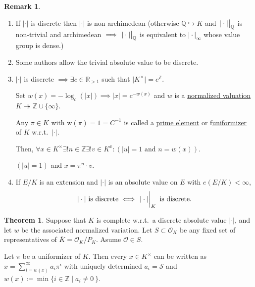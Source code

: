 \documentclass[openany]{amsbook}
\numberwithin{section}{chapter}
\theoremstyle{definition}
\newtheorem*{remark}{Remark}
\newtheorem{theorem}{Theorem}[chapter]
\begin{document}
\begin{remark}
    \begin{enumerate}[label=\arabic*)]
        \item If \(\vert \cdot \vert\) is discrete then \(\vert \cdot \vert \) is non-archimedean (otherwise \(\mathbb{Q} \hookrightarrow K\) and \(\eval{\vert \cdot \vert }_{\mathbb{Q}}\) is non-trivial and archimedean \(\implies \eval{\vert \cdot \vert}_{\mathbb{Q}}\) is equivalent to \(\vert \cdot \vert_\infty\) whose value group is dense.)
        \item Some authors allow the trivial absolute value to be discrete.
        \item \(\vert \cdot \vert\) is discrete \(\implies \exists c \in \mathbb{R}_{>1}\) such that \(\vert K^\times \vert = c^\mathbb{Z}\).
        
        Set \(w(x) = - \log_c(\vert x \vert) \implies \vert x \vert = c^{-w(x)}\) and \(w\) is a \underline{normalized valuation} \(K \twoheadrightarrow \mathbb{Z} \cup \{ \infty \} \).

        Any \(\pi \in K\) with w\((\pi) = 1 = C ^{-1}\) is called a \underline{prime element} or f\underline{uniformizer} of \(K\) w.r.t.\ \(\vert \cdot \vert\).

        Then, \(\forall x\in K^\times \exists ! n\in \mathbb{Z} \exists !v \in K^x : (\vert u \vert = 1 \text{ and } n=w(x) )\).

        \((\vert u \vert = 1)\) and \(x = \pi^n \cdot v\).

        \item If \(E / K\) is an extension and \(\vert \cdot \vert\) is an absolute value on \(E\) with \(e(E / K) < \infty\),
        \[
            \vert \cdot \vert \text{ is discrete} \iff \eval{\vert \cdot \vert}_K \text{ is discrete}. 
        \]

\end{enumerate} 
\end{remark}

\begin{theorem}
    Suppose that \(K\) is complete w.r.t.\ a discrete absolute value \(\vert \cdot \vert\), and let \(w\) be the associated normalized variation. Let \(S \subset \mathcal{O}_K\) be any fixed set of representatives of \(\overline{K} = \mathcal{O}_K / P_K\). Asume \(\mathcal{O} \in S\).

    Let \(\pi\) be a uniformizer of \(K\). Then every \(x\in K^\times\) can be written as \(x = \sum_{i=w(x)}^{\infty} a_i\pi^i\) with uniquely determined \(a_i = \mathcal{S}\) and \(w(x) \coloneqq \min \{ i\in \mathbb{Z} \mid a_i \neq 0 \ \} \).  
\end{theorem}
\end{document}
